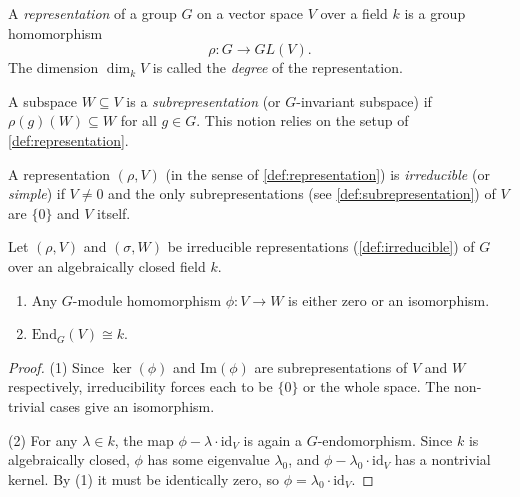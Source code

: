 
\begin{definition}
\label{def:representation}
A \textit{representation} of a group $G$ on a vector space $V$ over a field $k$
is a group homomorphism
\[
  \rho : G \to GL(V).
\]
The dimension $\dim_k V$ is called the \textit{degree} of the representation.
\end{definition}

\begin{definition}[Subrepresentation]
\label{def:subrepresentation}
A subspace $W \subseteq V$ is a \textit{subrepresentation} (or $G$-invariant
subspace) if $\rho(g)(W) \subseteq W$ for all $g \in G$.
This notion relies on the setup of \ref{def:representation}.
\end{definition}

\begin{definition}
\label{def:irreducible}
A representation $(\rho, V)$ (in the sense of \ref{def:representation}) is
\textit{irreducible} (or \textit{simple}) if $V \neq 0$ and the only
subrepresentations (see \ref{def:subrepresentation}) of $V$ are $\{0\}$ and
$V$ itself.
\end{definition}

\begin{theorem}
\label{thm:schur}
Let $(\rho, V)$ and $(\sigma, W)$ be irreducible representations
(\ref{def:irreducible}) of $G$ over an algebraically closed field $k$.
\begin{enumerate}
  \item Any $G$-module homomorphism $\phi : V \to W$ is either zero or an
        isomorphism.
  \item $\mathrm{End}_G(V) \cong k$.
\end{enumerate}
\end{theorem}

\begin{proof}
(1) Since $\ker(\phi)$ and $\mathrm{Im}(\phi)$ are subrepresentations of $V$
and $W$ respectively, irreducibility forces each to be $\{0\}$ or the whole
space. The non-trivial cases give an isomorphism.

(2) For any $\lambda \in k$, the map $\phi - \lambda \cdot \mathrm{id}_V$ is
again a $G$-endomorphism. Since $k$ is algebraically closed, $\phi$ has some
eigenvalue $\lambda_0$, and $\phi - \lambda_0 \cdot \mathrm{id}_V$ has a
nontrivial kernel. By (1) it must be identically zero, so $\phi = \lambda_0
\cdot \mathrm{id}_V$.
\end{proof}

